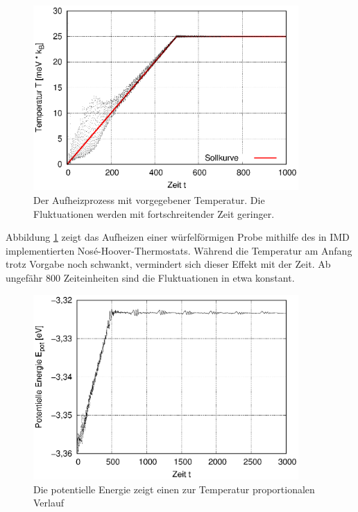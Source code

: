 		\begin{figure}[!ht]
			\centering
			\includegraphics[width=0.9\textwidth]{chapter/main/single/plt/equilibration/thermostat.eps}
			\caption{Der Aufheizprozess mit vorgegebener Temperatur. Die Fluktuationen werden
			mit fortschreitender Zeit geringer.}
			\label{fig:thermostat}
		\end{figure}

		Abbildung \ref{fig:thermostat} zeigt das Aufheizen einer würfelförmigen Probe mithilfe des
		in IMD implementierten Nosé-Hoover-Thermostats. Während die Temperatur am Anfang trotz
		Vorgabe noch schwankt, vermindert sich dieser Effekt mit der Zeit. Ab ungefähr 800
		Zeiteinheiten sind die Fluktuationen in etwa konstant.

		\begin{figure}[!ht]
			\centering
			\includegraphics[width=0.9\textwidth]{chapter/main/single/plt/equilibration/thermostat_pot.eps}
			\caption{Die potentielle Energie zeigt einen zur Temperatur proportionalen Verlauf}
			\label{fig:thermostat_pot}
		\end{figure}

